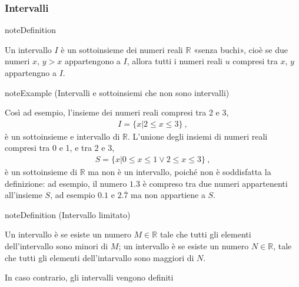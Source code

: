 \documentclass[letterpaper,10pt,italian]{jupyterBook}
\begin{document}
\subsubsection{Intervalli}
\label{\detokenize{ch/infinitesimal_calculus/analysis:intervalli}}\label{None:interval-def}
\begin{sphinxadmonition}{note}{Definition }



\sphinxAtStartPar
Un intervallo \(I\) è un sottoinsieme dei numeri reali \(\mathbb{R}\) «senza buchi», cioè se due numeri \(x\), \(y > x\) appartengono a \(I\), allora tutti i numeri reali \(u\) compresi tra \(x\), \(y\) appartengno a \(I\).
\end{sphinxadmonition}
\label{None:interval-example}
\begin{sphinxadmonition}{note}{Example  (Intervalli e sottoinsiemi che non sono intervalli)}



\sphinxAtStartPar
Così ad esempio, l’insieme dei numeri reali compresi tra 2 e 3,
\begin{equation*}
\begin{split}I = \{ x | 2 \le x \le 3 \} \ ,\end{split}
\end{equation*}
\sphinxAtStartPar
è un sottoinsieme e intervallo di \(\mathbb{R}\). L’unione degli insiemi di numeri reali compresi tra 0 e 1, e tra 2 e 3,
\begin{equation*}
\begin{split}S = \{ x | 0 \le x \le 1 \lor 2 \le x \le 3 \} \ ,\end{split}
\end{equation*}
\sphinxAtStartPar
è un sottoinsieme di \(\mathbb{R}\) ma non è un intervallo, poiché non è soddisfatta la definizione: ad esempio, il numero \(1.3\) è compreso tra due numeri appartenenti all’insieme \(S\), ad esempio \(0.1\) e \(2.\overline{7}\) ma non appartiene a \(S\).
\end{sphinxadmonition}
\label{None:interval-limited}
\begin{sphinxadmonition}{note}{Definition  (Intervallo limitato)}



\sphinxAtStartPar
Un intervallo è  se esiste un numero \(M \in \mathbb{R}\) tale che tutti gli elementi dell’intervallo sono minori di \(M\); un intervallo è  se esiste un numero \(N \in \mathbb{R}\), tale che tutti gli elementi dell’intarvallo sono maggiori di \(N\).

\sphinxAtStartPar
In caso contrario, gli intervalli vengono definiti 
\end{sphinxadmonition}
\end{document}
